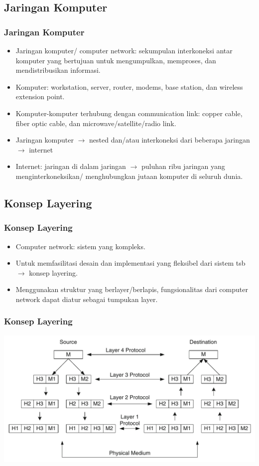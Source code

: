 \documentclass[pdflatex,compress]{beamer}
\begin{document}
\subsection{Jaringan Komputer}
\begin{frame}
	\frametitle{Jaringan Komputer}
	\begin{itemize}
		\item Jaringan komputer/ computer network: sekumpulan interkoneksi antar komputer yang bertujuan untuk mengumpulkan, memproses, dan mendistribusikan informasi.
		\item Komputer: workstation, server, router, modems, base station, dan wireless extension point.
		\item Komputer-komputer terhubung dengan communication link: copper cable, fiber optic cable, dan microwave/satellite/radio link.
		\item Jaringan komputer $\rightarrow$ nested dan/atau interkoneksi dari beberapa jaringan $\rightarrow$ internet
		\item Internet: jaringan di dalam jaringan $\rightarrow$ puluhan ribu jaringan yang menginterkoneksikan/ menghubungkan jutaan komputer di seluruh dunia.
	\end{itemize}
\end{frame}

\subsection{Konsep Layering}
\begin{frame}
	\frametitle{Konsep Layering}
	\begin{itemize}
		\item Computer network: sistem yang kompleks.
		\item Untuk memfasilitasi desain dan implementasi yang fleksibel dari sistem tsb $\rightarrow$ konsep layering.
		\item Menggunakan struktur yang berlayer/berlapis, fungsionalitas dari computer network dapat diatur sebagai tumpukan layer.
	\end{itemize}
\end{frame}

\begin{frame}
	\frametitle{Konsep Layering}	
	\begin{center}
		\includegraphics[width=\linewidth]{img/img001}
	\end{center}	
\end{frame}
\end{document}

